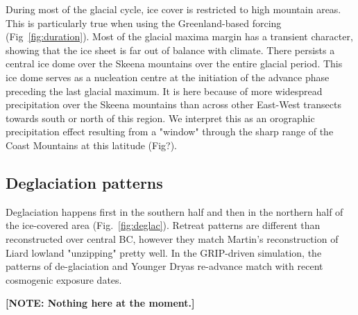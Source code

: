 \documentclass[tc, ms]{copernicus}
\newcommand{\note}[1]{\textbf{[NOTE: #1]}}
\begin{document}
During most of the glacial cycle, ice cover is restricted to high mountain
areas. This is particularly true when using the Greenland-based forcing
(Fig~\ref{fig:duration}). Most of the glacial maxima margin has a transient
character, showing that the ice sheet is far out of balance with climate. There
persists a central ice dome over the Skeena mountains over the entire glacial
period. This ice dome serves as a nucleation centre at the initiation of the
advance phase preceding the last glacial maximum. It is here because of more
widespread precipitation over the Skeena mountains than across other East-West
transects towards south or north of this region. We interpret this as an
orographic precipitation effect resulting from a "window" through the sharp
range of the Coast Mountains at this latitude (Fig?).

\subsection{Deglaciation patterns}

Deglaciation happens first in the southern half and then in the northern half
of the ice-covered area (Fig.~\ref{fig:deglac}). Retreat patterns are different
than reconstructed over central BC, however they match Martin's reconstruction
of Liard lowland "unzipping" pretty well. In the GRIP-driven simulation, the
patterns of de-glaciation and Younger Dryas re-advance match with recent
cosmogenic exposure dates.

\conclusions
\label{sec:concl}

\note{Nothing here at the moment.}


%
\newpage

\end{document}
